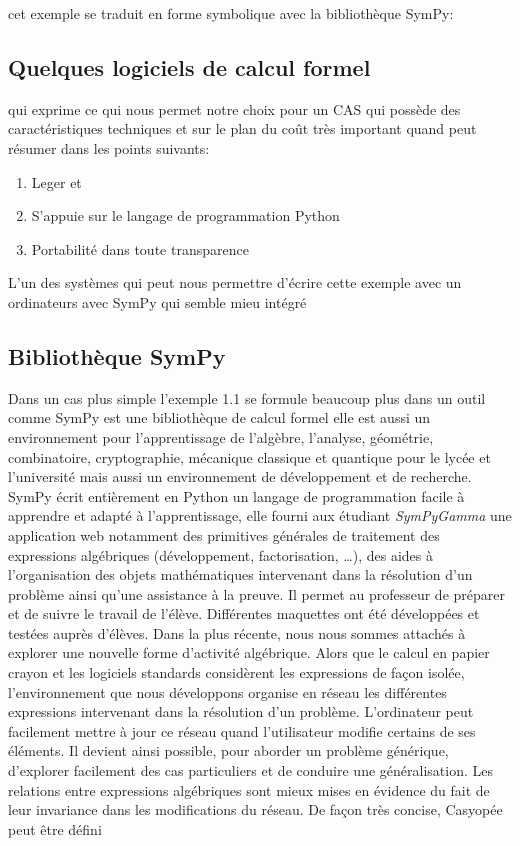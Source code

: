 cet exemple se traduit en forme symbolique avec la bibliothèque SymPy:

\subsection{Quelques logiciels de calcul formel}

qui exprime ce qui nous permet notre choix pour un CAS qui possède des caractéristiques techniques et sur le plan du coût très important quand peut résumer dans les points suivants:
\begin{enumerate}
	\item Leger et 
	\item S’appuie sur le langage de programmation Python
	\item Portabilité dans toute transparence
\end{enumerate}

L'un des systèmes qui peut nous permettre d'écrire cette exemple avec un ordinateurs avec SymPy qui semble mieu intégré

\subsection{Bibliothèque SymPy}

Dans un cas plus simple l'exemple 1.1 se formule beaucoup plus dans un outil comme SymPy est une bibliothèque de calcul formel elle est aussi un environnement pour 
l’apprentissage de l’algèbre, l’analyse, géométrie, combinatoire, cryptographie, mécanique 
classique et quantique pour le lycée et l’université mais aussi un environnement de 
développement et de recherche. SymPy  écrit entièrement en Python un langage de 
programmation facile à apprendre et adapté à l’apprentissage,  elle fourni aux étudiant 
\textit{SymPyGamma} une application web   notamment des primitives générales de traitement des expressions algébriques (développement, factorisation, …), des aides à l’organisation des objets mathématiques intervenant dans la résolution d’un problème ainsi qu’une assistance à la preuve. Il permet au professeur de préparer et de suivre le travail de l’élève. Différentes maquettes ont été développées et testées auprès d’élèves. Dans la plus récente, nous nous sommes attachés à explorer une nouvelle forme d’activité algébrique. Alors que le calcul en papier crayon et les logiciels standards considèrent
 les expressions de façon isolée, l’environnement que nous développons organise en réseau les différentes expressions intervenant dans la résolution d’un problème. L’ordinateur peut facilement mettre à jour ce réseau quand l’utilisateur modifie certains de ses éléments. Il devient ainsi possible, pour aborder un problème générique, d’explorer facilement des cas particuliers et de conduire une généralisation. Les relations entre expressions algébriques sont mieux mises en évidence du fait de leur invariance dans les modifications du réseau. De façon très concise, Casyopée peut être défini
